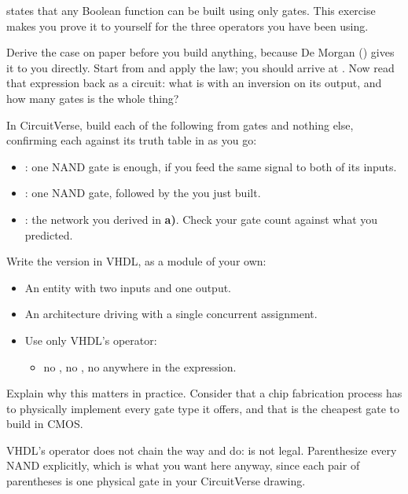 \label{c1:ex:6}
 states that any Boolean function can be built using only  gates. This
exercise makes you prove it to yourself for the three operators you have been using.

\begin{parts}
  \item Derive the  case on paper before you build anything, because De Morgan
    () gives it to you directly. Start from  and apply the law; you
    should arrive at . Now read that expression back as a circuit: what is 
    with an inversion on its output, and how many  gates is the whole thing?
  \item In CircuitVerse, build each of the following from  gates and nothing else,
    confirming each against its truth table in  as you go:
    \begin{itemize}
      \item {}: one NAND gate is enough, if you feed the same signal to both of its
        inputs.
      \item {}: one NAND gate, followed by the  you just built.
      \item {}: the network you derived in \textbf{a)}. Check your gate count against
        what you predicted.
    \end{itemize}
  \item Write the  version in VHDL, as a module of your own:
    \begin{itemize}
      \item An entity with two  inputs and one  output.
      \item An architecture driving  with a single concurrent assignment.
      \item Use only VHDL's  operator:
      \begin{itemize}
        \item no , no , no  anywhere in the expression.
      \end{itemize}
    \end{itemize}
  \item Explain why this matters in practice. Consider that a chip fabrication process has to
    physically implement every gate type it offers, and that  is the cheapest gate to
    build in CMOS.
\end{parts}
\note[Tip] VHDL's  operator does not chain the way  and  do:
 is not legal. Parenthesize every NAND explicitly, which is what you want
here anyway, since each pair of parentheses is one physical gate in your CircuitVerse drawing.

